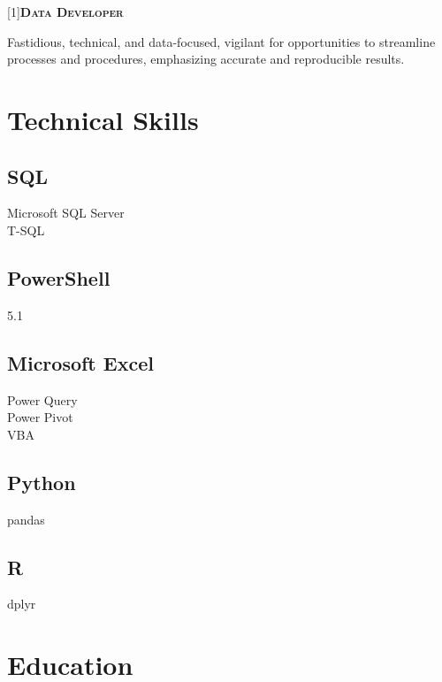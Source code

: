 \documentclass{resume}
\begin{document}
\namecontactheader
\begin{minipage}[t]{.3\textwidth}
    \scalebox{1.4}[1]{\large\scshape \textsf{\bfseries Data Developer}}
    \vspace{1ex}
    
    Fastidious, technical, and data-focused, vigilant for opportunities
    to streamline processes and procedures, emphasizing accurate and
    reproducible results.
    \section{Technical Skills}

        \subsection{SQL
            \hspace{2em}}
            Microsoft SQL Server\\
            T-SQL\\

        \subsection{PowerShell
            \hspace{2em}}
            5.1

        \subsection{Microsoft Excel
            \hspace{2em}}
            Power Query\\
            Power Pivot\\
            VBA\\

        \subsection{Python
            \hspace{2em}}
            pandas

        \subsection{R
            \hspace{2em}}
            dplyr


    \section{Education}

\end{minipage}
\end{document}
